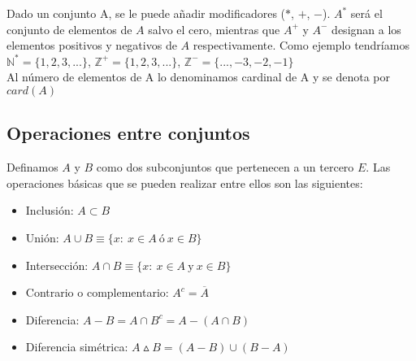 \documentclass[0_algebra.tex]{subfiles}
\begin{document}
Dado un conjunto A, se le puede añadir modificadores ($*$, $+$, $-$). $A^*$ será el conjunto de elementos de $A$ salvo el cero, mientras que $A^+$ y $A^-$ designan a los elementos positivos y negativos de $A$ respectivamente. Como ejemplo tendríamos $\mathbb{N}^*=\lbrace 1,2,3,... \rbrace$, $\mathbb{Z}^+=\lbrace 1,2,3,... \rbrace$, $\mathbb{Z}^-=\lbrace ...,-3,-2,-1\rbrace$\\

Al número de elementos de A lo denominamos cardinal de A y se denota por $card(A)$


\subsection*{Operaciones entre conjuntos}
Definamos $A$ y $B$ como dos subconjuntos que pertenecen a un tercero $E$. Las operaciones básicas que se pueden realizar entre ellos son las siguientes:

\begin{itemize}
\item Inclusión: $A\subset B$
\begin{figure}[h]
\centering

\end{figure}

\item Unión: $A \cup B \equiv \lbrace x: \ x \in A\ \text{ó} \ x \in B\rbrace$

\begin{figure}[h]
\centering

\end{figure}

\item Intersección: $A \cap B \equiv \lbrace x: \ x \in A\ \text{y} \ x \in B\rbrace$

\begin{figure}[h]
\centering

\end{figure}
\newpage

\item Contrario o complementario: $A^c = \overline{A}$

\begin{figure}[h]
\centering

\end{figure}


\item Diferencia: $A-B=A\cap B^c=A-(A\cap B)$

\begin{figure}[h]
\centering

\end{figure}

\item Diferencia simétrica: $A\vartriangle B=(A-B)\cup (B-A)$

\begin{figure}[h]
\centering

\end{figure}

\end{itemize}
\end{document}
